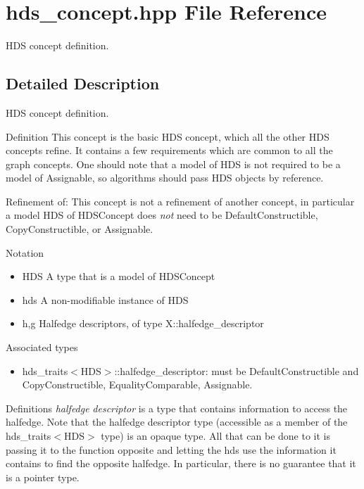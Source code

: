 \section{hds\_\-concept.hpp File Reference}
\label{hds__concept_8hpp}
HDS concept definition. 



\subsection{Detailed Description}
HDS concept definition. 

\begin{Desc}
\item[Definition]This concept is the basic HDS concept, which all the other HDS concepts refine. It contains a few requirements which are common to all the graph concepts. One should note that a model of HDS is not required to be a model of Assignable, so algorithms should pass HDS objects by reference.\end{Desc}
\begin{Desc}
\item[Refinement of:]This concept is not a refinement of another concept, in particular a model HDS of HDSConcept does {\em not\/} need to be Default\-Constructible, Copy\-Constructible, or Assignable.\end{Desc}
\begin{Desc}
\item[Notation]\begin{itemize}
\item HDS A type that is a model of HDSConcept\item hds A non-modifiable instance of HDS\item h,g Halfedge descriptors, of type X::halfedge\_\-descriptor\end{itemize}
\end{Desc}
\begin{Desc}
\item[Associated types]\begin{itemize}
\item hds\_\-traits$<$HDS$>$::halfedge\_\-descriptor: must be Default\-Constructible and Copy\-Constructible, Equality\-Comparable, Assignable.\end{itemize}
\end{Desc}
\begin{Desc}
\item[Definitions]{\em halfedge\/} {\em descriptor\/} is a type that contains information to access the halfedge. Note that the halfedge descriptor type (accessible as a member of the hds\_\-traits$<$HDS$>$ type) is an opaque type. All that can be done to it is passing it to the function opposite and letting the hds use the information it contains to find the opposite halfedge. In particular, there is no guarantee that it is a pointer type.\end{Desc}
